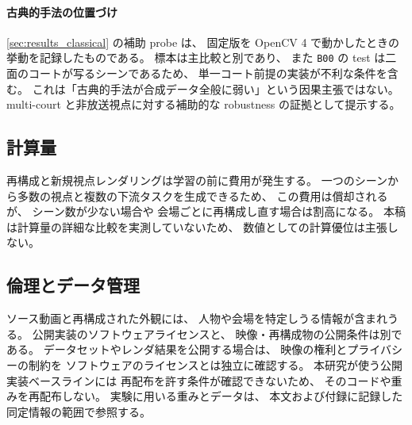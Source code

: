 \paragraph{古典的手法の位置づけ}
\cref{sec:results_classical} の補助 probe は、
固定版を OpenCV 4 で動かしたときの挙動を記録したものである。
標本は主比較と別であり、
また \texttt{B00} の test は二面のコートが写るシーンであるため、
単一コート前提の実装が不利な条件を含む。
これは「古典的手法が合成データ全般に弱い」という因果主張ではない。
multi-court と非放送視点に対する補助的な robustness の証拠として提示する。

\subsection{計算量}
\label{sec:compute}

再構成と新規視点レンダリングは学習の前に費用が発生する。
一つのシーンから多数の視点と複数の下流タスクを生成できるため、
この費用は償却されるが、
シーン数が少ない場合や
会場ごとに再構成し直す場合は割高になる。
本稿は計算量の詳細な比較を実測していないため、
数値としての計算優位は主張しない。

\subsection{倫理とデータ管理}
\label{sec:ethics}

ソース動画と再構成された外観には、
人物や会場を特定しうる情報が含まれうる。
公開実装のソフトウェアライセンスと、
映像・再構成物の公開条件は別である。
データセットやレンダ結果を公開する場合は、
映像の権利とプライバシーの制約を
ソフトウェアのライセンスとは独立に確認する。
本研究が使う公開実装ベースラインには
再配布を許す条件が確認できないため、
そのコードや重みを再配布しない。
実験に用いる重みとデータは、
本文および付録に記録した同定情報の範囲で参照する。
